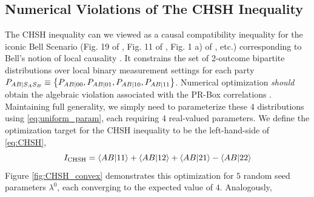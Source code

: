 \documentclass[aps, 10pt, english, twoside, pra, nofootinbib, longbibliography]{revtex4-1}
\theoremstyle{plain}
\theoremstyle{definition}
\theoremstyle{remark}
\begin{document}
    \subsection{Numerical Violations of The CHSH Inequality}
    The CHSH inequality \cite{CHSH_Original} can we viewed as a causal compatibility inequality for the iconic Bell Scenario (Fig. 19 of \cite{Wood_2012}, Fig. 11 of \cite{Inflation}, Fig. 1 a) of \cite{Tavakoli_2015}, etc.) corresponding to Bell's notion of local causality \cite{Wood_2012}. It constrains the set of 2-outcome bipartite distributions over local binary measurement settings for each party $\prob[AB\mid S_A S_B] \defined \bc{\prob[AB\mid 0 0], \prob[AB\mid 01], \prob[AB\mid 10], \prob[AB\mid 11]}$. Numerical optimization \textit{should} obtain the algebraic violation associated with the PR-Box correlations \cite{PR_1995}. Maintaining full generality, we simply need to parameterize these $4$ distributions using \cref{eq:uniform_param}, each requiring $4$ real-valued parameters. We define the optimization target for the CHSH inequality to be the left-hand-side of \cref{eq:CHSH},
    \[ I\tsb{CHSH} = \ba{AB|11} + \ba{AB|12} + \ba{AB|21} - \ba{AB|22} \]
    Figure \ref{fig:CHSH_convex} demonstrates this optimization for $5$ random seed parameters $\lambda^0$, each converging to the expected value of $4$. Analogously, \cite{Cirelson_1980}
\end{document}

